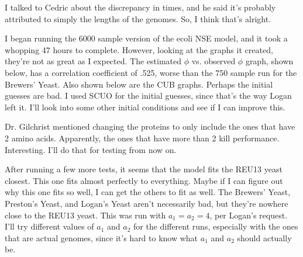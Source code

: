 \documentclass[12 pt]{article}
\begin{document}
\begin{enumerate}
				I talked to Cedric about the discrepancy in times, and he said it's probably attributed to simply the lengths of the genomes. So, I think that's alright.
				
				I began running the 6000 sample version of the ecoli NSE model, and it took a whopping 47 hours to complete. However, looking at the graphs it created, they're not as great as I expected. The estimated $ \phi $ vs. observed $ \phi $ graph, shown below, has a correlation coefficient of .525, worse than the 750 sample run for the Brewers' Yeast. Also shown below are the CUB graphs. Perhaps the initial guesses are bad. I used SCUO for the initial guesses, since that's the way Logan left it. I'll look into some other initial conditions and see if I can improve this.
				
				
				
				
				
				Dr. Gilchrist mentioned changing the proteins to only include the ones that have 2 amino acids. Apparently, the ones that have more than 2 kill performance. Interesting. I'll do that for testing from now on.
				
				After running a few more tests, it seems that the model fits the REU13 yeast closest. This one fits almost perfectly to everything. Maybe if I can figure out why this one fits so well, I can get the others to fit as well. The Brewers' Yeast, Preston's Yeast, and Logan's Yeast aren't necessarily bad, but they're nowhere close to the REU13 yeast. This was run with $ a_1 = a_2 = 4 $, per Logan's request. I'll try different values of $ a_1 $ and $ a_2 $ for the different runs, especially with the ones that are actual genomes, since it's hard to know what $ a_1 $ and $ a_2 $ should actually be.
				
				
 			\end{enumerate} 
 			
\end{document}
